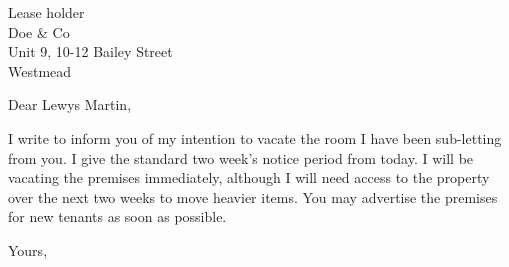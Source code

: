 \documentclass{letter}
\begin{document}
\begin{letter}{Lease holder \\ Doe \& Co \\ Unit 9, 10-12 Bailey Street
\\ Westmead }
\opening{Dear Lewys Martin,}

I write to inform you of my intention to vacate the room I have been sub-letting from you. I give the standard
two week's notice period from today. I will be vacating the premises immediately, although I will need access
to the property over the next two weeks to move heavier items. You may advertise the premises for new tenants
as soon as possible.

\closing{Yours,}

\end{letter}
\end{document}
